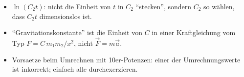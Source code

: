 \begin{achtung}
\begin{itemize}
  \item $\ln(C_2t)$: nicht die Einheit von $t$ in $C_2$ ``stecken'',
        sondern $C_2$ so wählen, dass $C_2t$ dimensionslos ist.
  \item ``Gravitationskonstante'' ist die Einheit von $C$ in einer
        Kraftgleichung vom Typ $F=C\,m_1m_2/x^2$, nicht $\vec F=m\vec a$.
  \item Vorsaetze beim Umrechnen mit 10er-Potenzen: einer der
        Umrechnungswerte ist inkorrekt; einfach alle durchexerzieren.
\end{itemize}
\end{achtung}
